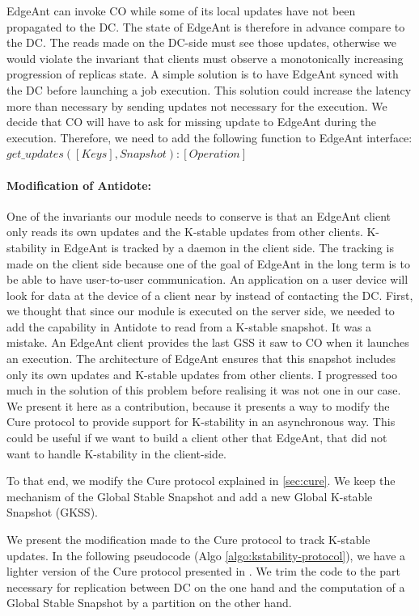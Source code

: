 \documentclass[11pt]{article}
\begin{document}
EdgeAnt can invoke CO while some of its local updates have not been propagated
to the DC. The state of EdgeAnt is therefore in advance compare to the DC. The
reads made on the DC-side must see those updates, otherwise we would violate
the invariant that clients must observe a monotonically increasing progression
of replicas state. A simple solution is to have EdgeAnt synced with the DC
before launching a job execution. This solution could increase the latency
more than necessary by sending updates not necessary for the execution. We
decide that CO will have to ask for missing update to EdgeAnt during the
execution. Therefore, we need to add the following function to EdgeAnt
interface: $get\_updates([Keys], Snapshot) : [Operation]$ \\

\paragraph{Modification of Antidote:}\mbox{}

One of the invariants our module needs to conserve is that an EdgeAnt client
only reads its own updates and the K-stable updates from other clients.
K-stability in EdgeAnt is tracked by a daemon in the client side. The tracking
is made on the client side because one of the goal of EdgeAnt in the long term
is to be able to have user-to-user communication. An application on a user
device will look for data at the device of a client near by instead of
contacting the DC. First, we thought that since our module is executed on the
server side, we needed to add the capability in Antidote to read from a
K-stable snapshot. It was a mistake. An EdgeAnt client provides the last GSS
it saw to CO when it launches an execution. The architecture of EdgeAnt
ensures that this snapshot includes only its own updates and K-stable updates
from other clients. I progressed too much in the solution of this problem
before realising it was not one in our case. We present it here as a
contribution, because it presents a way to modify the Cure protocol to provide
support for K-stability in an asynchronous way. This could be useful if we
want to build a client other that EdgeAnt, that did not want to handle
K-stability in the client-side.

To that end, we modify the Cure protocol explained in \ref{sec:cure}. We keep
the mechanism of the Global Stable Snapshot and add a new Global K-stable
Snapshot (GKSS).

We present the modification made to the Cure protocol to track K-stable
updates. In the following pseudocode (Algo \ref{algo:kstability-protocol}), we
have a lighter version of the Cure protocol presented in \cite{Cure2016}. We
trim the code to the part necessary for replication between DC on the one hand
and the computation of a Global Stable Snapshot by a partition on the other
hand.
\end{document}
